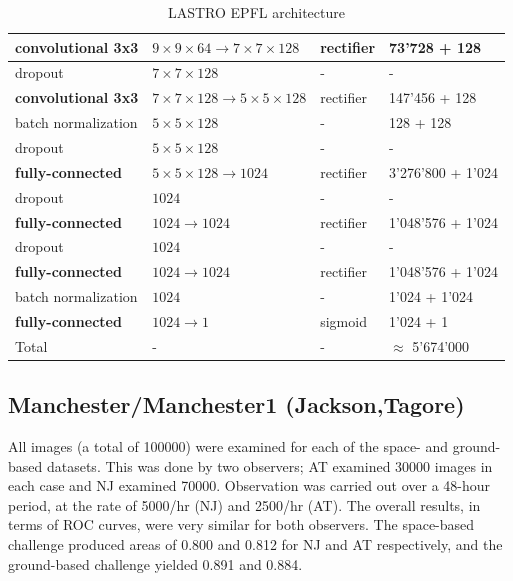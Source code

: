 \documentclass[useAMS,usenatbib]{mnras}
\begin{document}
\begin{table}
\begin{tabular}{|l|l|l|l|}
        \textbf{convolutional 3x3} & $9\times9\times64 \to 7\times7\times128$ & rectifier & 73'728 + 128 \\ \hline
        dropout & $7\times7\times128$ & - & - \\ \hline
        \textbf{convolutional 3x3} & $7\times7\times128 \to 5\times5\times128$ & rectifier & 147'456 + 128 \\ \hline
        batch normalization & $5\times5\times128$ & - & 128 + 128 \\ \hline
        dropout & $5\times5\times128$ & - & - \\ \hline
        
        \textbf{fully-connected} & $5\times5\times128 \to 1024$ & rectifier & 3'276'800 + 1'024 \\ \hline
        dropout & $1024$ & - & - \\ \hline
        \textbf{fully-connected} & $1024 \to 1024$ & rectifier & 1'048'576 + 1'024 \\ \hline
        dropout & $1024$ & - & - \\ \hline
        \textbf{fully-connected} & $1024 \to 1024$ & rectifier & 1'048'576 + 1'024 \\ \hline
        batch normalization & $1024$ & - & 1'024 + 1'024 \\ \hline
        \textbf{fully-connected} & $1024 \to 1$ & sigmoid & 1'024 + 1 \\ \hline \hline
        Total & - & - & $\approx$ 5'674'000 \\ \hline
    \end{tabular}
    \caption{LASTRO EPFL architecture}
    \label{tab:architecture}
\end{table}

\subsection{Manchester/Manchester1 (Jackson,Tagore)}

All images (a total of 100000) were examined for each of the space- and
ground-based datasets. This was done by two observers; AT examined 30000
images in each case and NJ examined 70000. Observation was carried out
over a 48-hour period, at the rate of 5000/hr (NJ) and 2500/hr (AT). 
The overall results, in terms of ROC curves, were very similar for 
both observers. The space-based challenge produced areas of 0.800 and 
0.812 for NJ and AT respectively, and the ground-based challenge yielded 
0.891 and 0.884.
\end{document}
